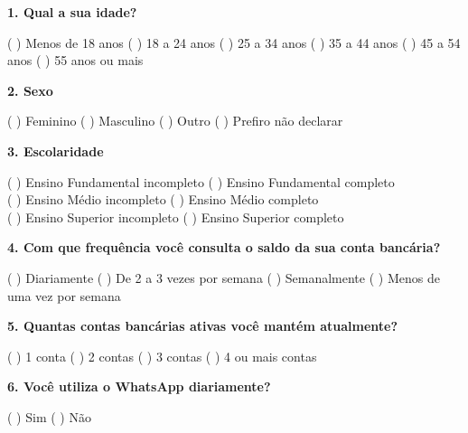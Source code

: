 \newpage
\begingroup
\setlength{\parindent}{0pt}


\textbf{1. Qual a sua idade?}

\vspace{4pt}
( ) Menos de 18 anos \quad ( ) 18 a 24 anos \quad ( ) 25 a 34 anos \quad ( ) 35 a 44 anos \quad ( ) 45 a 54 anos \quad ( ) 55 anos ou mais

\vspace{10pt}

\textbf{2. Sexo}

\vspace{4pt}
( ) Feminino \quad ( ) Masculino \quad ( ) Outro \quad ( ) Prefiro não declarar

\vspace{10pt}

\textbf{3. Escolaridade}

\vspace{4pt}
( ) Ensino Fundamental incompleto \quad ( ) Ensino Fundamental completo\\
( ) Ensino Médio incompleto \quad ( ) Ensino Médio completo\\
( ) Ensino Superior incompleto \quad ( ) Ensino Superior completo

\vspace{10pt}

\textbf{4. Com que frequência você consulta o saldo da sua conta bancária?}

\vspace{4pt}
( ) Diariamente \quad ( ) De 2 a 3 vezes por semana \quad ( ) Semanalmente \quad ( ) Menos de uma vez por semana

\vspace{10pt}

\textbf{5. Quantas contas bancárias ativas você mantém atualmente?}

\vspace{4pt}
( ) 1 conta \quad ( ) 2 contas \quad ( ) 3 contas \quad ( ) 4 ou mais contas

\vspace{10pt}

\textbf{6. Você utiliza o WhatsApp diariamente?}

\vspace{4pt}
( ) Sim \quad ( ) Não

\vspace{10pt}

